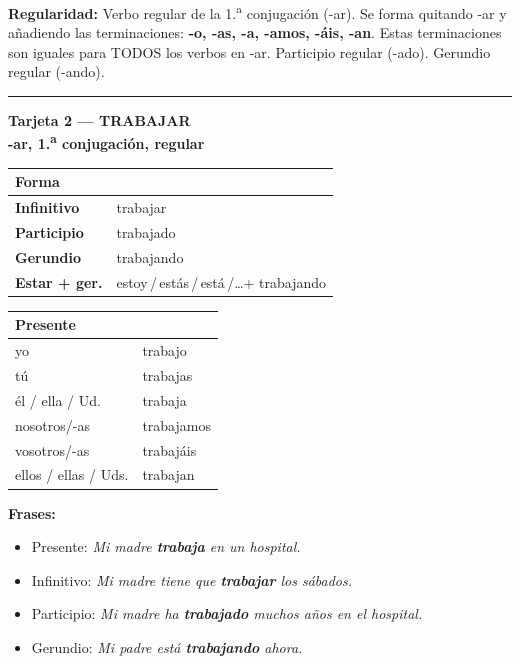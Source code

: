 \documentclass[a4paper,10pt]{article}
\newcommand{\verboheader}[3]{%
  \noindent
  \colorbox{azulverbo!90}{\parbox{\dimexpr\linewidth-2\fboxsep}{%
    \centering\color{white}\bfseries\large Tarjeta #1 --- #2\\[2pt]
    \normalsize #3%
  }}
  \vspace{4pt}
}
\newcommand{\tarjetasep}{%
  \vspace{6pt}
  \noindent\rule{\linewidth}{0.4pt}
  \vspace{6pt}
}
\begin{document}
\begin{trucoverbo}
\textbf{Regularidad:} Verbo regular de la 1.\textsuperscript{a} conjugación (-ar). Se forma quitando -ar y añadiendo las terminaciones: \textbf{-o, -as, -a, -amos, -áis, -an}. Estas terminaciones son iguales para TODOS los verbos en -ar. Participio regular (-ado). Gerundio regular (-ando).
\end{trucoverbo}

\tarjetasep

\verboheader{2}{TRABAJAR}{-ar, 1.\textsuperscript{a} conjugación, regular}

\begin{minipage}[t]{0.48\linewidth}
\small
\begin{tabular}{|>{\bfseries}l|l|}
\hline
\rowcolor{azulverbo!15} Forma & \\
\hline
Infinitivo & trabajar \\
\hline
\rowcolor{grisclaro}
Participio & trabajado \\
\hline
Gerundio & trabajando \\
\hline
\rowcolor{grisclaro}
Estar + ger. & estoy\,/\,estás\,/\,está\,/\ldots\;+ trabajando \\
\hline
\end{tabular}
\end{minipage}
\hfill
\begin{minipage}[t]{0.48\linewidth}
\small
\begin{tabular}{|l|l|}
\hline
\rowcolor{azulverbo!15} \textbf{Presente} & \\
\hline
yo & trabajo \\
\hline
\rowcolor{grisclaro}
tú & trabajas \\
\hline
él / ella / Ud. & trabaja \\
\hline
\rowcolor{grisclaro}
nosotros/-as & trabajamos \\
\hline
vosotros/-as & trabajáis \\
\hline
\rowcolor{grisclaro}
ellos / ellas / Uds. & trabajan \\
\hline
\end{tabular}
\end{minipage}

\vspace{4pt}
\small
\textbf{Frases:}
\begin{itemize}[nosep, leftmargin=1em]
\item Presente: \textit{Mi madre \textbf{trabaja} en un hospital.}
\item Infinitivo: \textit{Mi madre tiene que \textbf{trabajar} los sábados.}
\item Participio: \textit{Mi madre ha \textbf{trabajado} muchos años en el hospital.}
\item Gerundio: \textit{Mi padre está \textbf{trabajando} ahora.}
\end{itemize}
\end{document}
